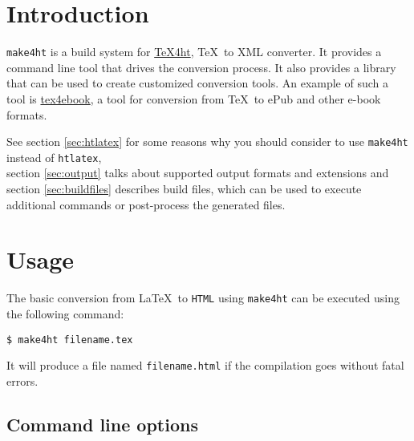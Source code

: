 \hypertarget{introduction}{%
\section{Introduction}\label{introduction}}

\texttt{make4ht} is a build system for
\href{https://tug.org/tex4ht/}{\TeX4ht}, \TeX~to XML converter. It
provides a command line tool that drives the conversion process. It also
provides a library that can be used to create customized conversion
tools. An example of such a tool is
\href{https://github.com/michal-h21/tex4ebook}{tex4ebook}, a tool for
conversion from \TeX~to ePub and other e-book formats.

See section \ref{sec:htlatex} for some reasons why you should consider
to use \texttt{make4ht} instead of \texttt{htlatex},\\
section \ref{sec:output} talks about supported output formats and
extensions and section \ref{sec:buildfiles} describes build files, which
can be used to execute additional commands or post-process the generated
files.

\hypertarget{usage}{%
\section{Usage}\label{usage}}

The basic conversion from \LaTeX~to \texttt{HTML} using \texttt{make4ht}
can be executed using the following command:

\begin{verbatim}
$ make4ht filename.tex
\end{verbatim}

It will produce a file named \texttt{filename.html} if the compilation
goes without fatal errors.

\hypertarget{clioptions}{%
\subsection{Command line options}\label{clioptions}}

\label{sec:clioptions}

